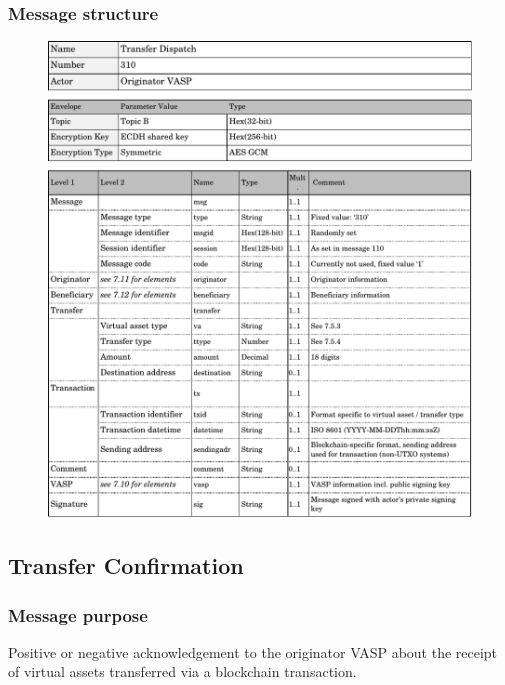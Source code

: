 \documentclass{article}
\begin{document}
\subsubsection{Message structure}
\begin{figure}[h]
    \centering
    \includegraphics[width=\textwidth]{g24.pdf}
\end{figure}
\subsection{Transfer Confirmation}
\subsubsection{Message purpose}
Positive or negative acknowledgement to the originator VASP about the receipt of virtual assets transferred via a blockchain transaction.
\end{document}

